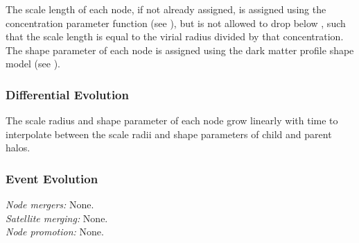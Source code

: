 The scale length of each node, if not already assigned, is assigned using the concentration parameter function (see ), but is not allowed to drop below {\normalfont \ttfamily [darkMatterProfileMinimumConcentration]}, such that the scale length is equal to the virial radius divided by that concentration. The shape parameter of each \gls{node} is assigned using the dark matter profile shape model (see ).

\subsubsection{Differential Evolution}

The scale radius and shape parameter of each node grow linearly with time to interpolate between the scale radii and shape parameters of child and parent halos.

\subsubsection{Event Evolution}

\noindent\emph{Node mergers:} None.\\

\noindent\emph{Satellite merging:} None.\\

\noindent\emph{Node promotion:} None.\\
